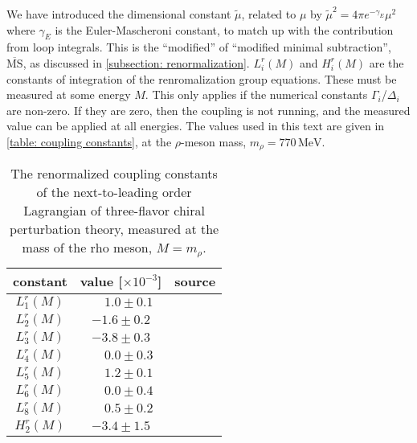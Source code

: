 %
We have introduced the dimensional constant $\tilde \mu$, related to $\mu$ by $\tilde \mu^2 = 4 \pi e^{-\gamma_E} \mu^2$ where $\gamma_E$ is the Euler-Mascheroni constant, to match up with the contribution from loop integrals.
This is the ``modified'' of ``modified minimal subtraction'', $\overline{\text{MS}}$, as discussed in \autoref{subsection: renormalization}.
$L_i^r(M)$ and $H_i^r(M)$ are the constants of integration of the renromalization group equations.
These must be measured at some energy $M$.
This only applies if the numerical constants $\Gamma_i$/$\Delta_i$ are non-zero.
If they are zero, then the coupling is not running, and the measured value can be applied at all energies.
The values used in this text are given in \autoref{table: coupling constants}, at the $\rho$-meson mass, $m_\rho = 770\, \text{MeV}$.
%
\begin{table}
    \centering
    \def\arraystretch{1.2}
    \caption{The renormalized coupling constants of the next-to-leading order Lagrangian of three-flavor chiral perturbation theory, measured at the mass of the rho meson, $M = m_\rho$.}
    \label{table: coupling constants}
    \begin{tabular}{c c c}
        \hline \hline
        constant & value [$\times 10^{-3}$] & source \\
        \hline
        $L_1^r(M)$ & $\phantom{-}1.0 \pm 0.1 $ & \autocite{bijnensMesonicLowEnergyConstants2014} \\
        $L_2^r(M)$ & $-1.6 \pm 0.2 $ & \autocite{bijnensMesonicLowEnergyConstants2014} \\
        $L_3^r(M)$ & $-3.8 \pm 0.3 $ & \autocite{bijnensMesonicLowEnergyConstants2014} \\
        $L_4^r(M)$ & $\phantom{-}0.0 \pm 0.3 $ & \autocite{bijnensMesonicLowEnergyConstants2014} \\
        $L_5^r(M)$ & $\phantom{-}1.2 \pm 0.1 $ & \autocite{bijnensMesonicLowEnergyConstants2014} \\
        $L_6^r(M)$ & $\phantom{-}0.0 \pm 0.4 $ & \autocite{bijnensMesonicLowEnergyConstants2014} \\
        $L_8^r(M)$ & $\phantom{-}0.5 \pm 0.2 $ & \autocite{bijnensMesonicLowEnergyConstants2014} \\
        $H_2^r(M)$ & $-3.4 \pm 1.5 $ & \autocite{jaminFlavoursymmetryBreakingQuark2002}  \\
        \hline
    \end{tabular}
\end{table}

